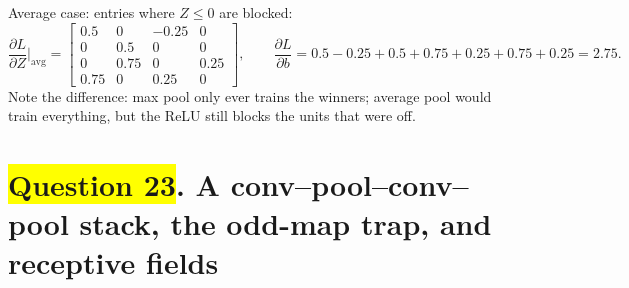 \documentclass[12pt,a4paper]{article}
\newcommand{\hlq}[1]{{\setlength{\fboxsep}{1.5pt}\colorbox{yellow}{#1}}}
\begin{document}
Average case: entries where $Z\le0$ are blocked:
\[
\frac{\partial L}{\partial Z}\Big|_{\text{avg}}=\begin{bmatrix}0.5&0&-0.25&0\\0&0.5&0&0\\0&0.75&0&0.25\\0.75&0&0.25&0\end{bmatrix},\qquad \frac{\partial L}{\partial b}=0.5-0.25+0.5+0.75+0.25+0.75+0.25=2.75 .
\]
Note the difference: max pool only ever trains the winners; average pool would train everything, but the ReLU still blocks the units that were off.

\section[Question 23. A conv--pool--conv--pool stack, the odd-map trap, and receptive fields]{\hlq{Question 23}. A conv--pool--conv--pool stack, the odd-map trap, and receptive fields}
\end{document}
